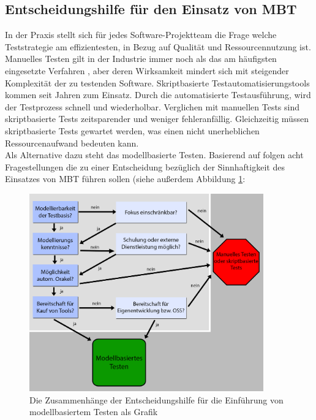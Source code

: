 \subsection{Entscheidungshilfe für den Einsatz von MBT}
\label{sec:entscheidungshilfe}
In der Praxis stellt sich für jedes Software-Projektteam die Frage welche Teststrategie am effizientesten, in Bezug auf Qualität und Ressourcennutzung ist. Manuelles Testen gilt in der Industrie immer noch als das am häufigsten eingesetzte Verfahren \cite{guldali_starthilfe_2010}, aber deren Wirksamkeit mindert sich mit steigender Komplexität der zu testenden Software. Skriptbasierte Testautomatisierungstools kommen seit Jahren zum Einsatz. Durch die automatisierte Testausführung, wird der Testprozess schnell und wiederholbar. Verglichen mit manuellen Tests sind skriptbasierte Tests zeitsparender und weniger fehleranfällig. Gleichzeitig müssen skriptbasierte Tests gewartet werden, was einen nicht unerheblichen Ressourcenaufwand bedeuten kann.\\
Als Alternative dazu steht das modellbasierte Testen. Basierend auf \cite{guldali_starthilfe_2010} folgen acht Fragestellungen die zu einer Entscheidung bezüglich der Sinnhaftigkeit des Einsatzes von MBT führen sollen (siehe außerdem Abbildung \ref{fig:entscheidungshilfe_mbt}:

\begin{figure}[h] 
  \centering
     \includegraphics[width=0.9\textwidth]{figures/entscheidungshilfe_mbt.png}
  \caption{Die Zusammenhänge der Entscheidungshilfe für die Einführung von modellbasiertem Testen als Grafik}
  \label{fig:entscheidungshilfe_mbt}
\end{figure}

